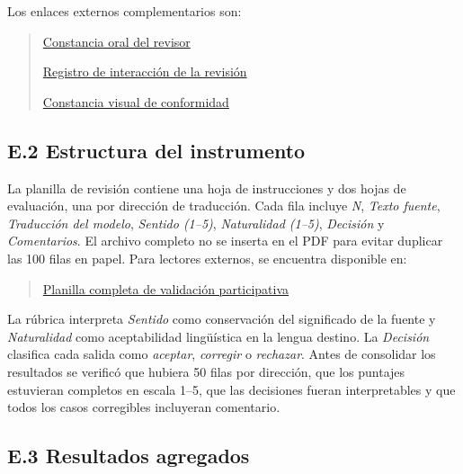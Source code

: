 \documentclass[12pt,a4paper,oneside]{book}
\begin{document}
Los enlaces externos complementarios son:

\begin{quote}
\small \href{https://drive.google.com/file/d/1vmpMNzfUMuKzzUV1f3pqhYOJWmvLWiV1/view?usp=sharing}{Constancia oral del revisor}

\small \href{https://drive.google.com/file/d/1OBcgrEWWMM6FFewm5_iqtCb2o9z1tIZV/view?usp=sharing}{Registro de interacción de la revisión}

\small \href{https://drive.google.com/file/d/1gN4nYax5ZVNwlFRW_ZjlZgUSPKMlZAMj/view?usp=sharing}{Constancia visual de conformidad}
\end{quote}

\subsection*{E.2 Estructura del instrumento}

La planilla de revisión contiene una hoja de instrucciones y dos hojas de evaluación, una por dirección de traducción. Cada fila incluye \emph{N}, \emph{Texto fuente}, \emph{Traducción del modelo}, \emph{Sentido (1--5)}, \emph{Naturalidad (1--5)}, \emph{Decisión} y \emph{Comentarios}. El archivo completo no se inserta en el PDF para evitar duplicar las 100 filas en papel. Para lectores externos, se encuentra disponible en:

\begin{quote}
\small\href{https://docs.google.com/spreadsheets/d/1dYJ_4qstg76dHtDs6qaIICG5aBeiG7kL/edit?usp=sharing&ouid=110915706047387486036&rtpof=true&sd=true}{Planilla completa de validación participativa}
\end{quote}

La rúbrica interpreta \emph{Sentido} como conservación del significado de la fuente y \emph{Naturalidad} como aceptabilidad lingüística en la lengua destino. La \emph{Decisión} clasifica cada salida como \emph{aceptar}, \emph{corregir} o \emph{rechazar}. Antes de consolidar los resultados se verificó que hubiera 50 filas por dirección, que los puntajes estuvieran completos en escala 1--5, que las decisiones fueran interpretables y que todos los casos corregibles incluyeran comentario.

\subsection*{E.3 Resultados agregados}
\end{document}
